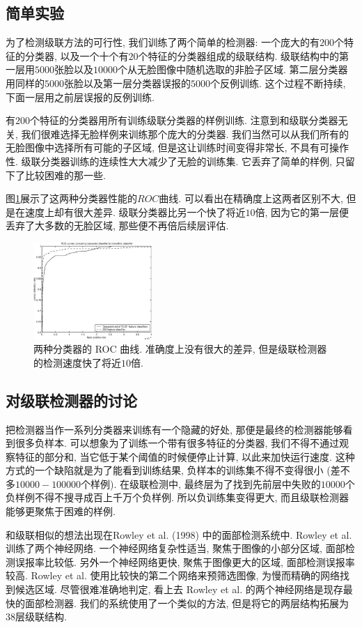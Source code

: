 \documentclass[a4paper,utf8,11pt, onecolumn]{ctexart}
\begin{document}
\subsection{简单实验}
为了检测级联方法的可行性, 我们训练了两个简单的检测器: 一个庞大的有$200$个特征的分类器, 以及一个十个有$20$个特征的分类器组成的级联结构. 级联结构中的第一层用$5000$张脸以及$10000$个从无脸图像中随机选取的非脸子区域.
第二层分类器用同样的$5000$张脸以及第一层分类器误报的$5000$个反例训练. 这个过程不断持续, 下面一层用之前层误报的反例训练.

有$200$个特征的分类器用所有训练级联分类器的样例训练. 注意到和级联分类器无关, 我们很难选择无脸样例来训练那个庞大的分类器. 我们当然可以从我们所有的无脸图像中选择所有可能的子区域, 但是这让训练时间变得非常长, 不具有可操作性. 级联分类器训练的连续性大大减少了无脸的训练集. 它丢弃了简单的样例, 只留下了比较困难的那一些.

图\ref{fig:comp}展示了这两种分类器性能的$ROC$曲线. 可以看出在精确度上这两者区别不大, 但是在速度上却有很大差异. 级联分类器比另一个快了将近$10$倍, 因为它的第一层便丢弃了大多数的无脸区域, 那些便不再倍后续层评估.
\begin{figure}
\centering
\includegraphics[width=0.4\textwidth]{ROC.png}
\caption{两种分类器的 ROC 曲线. 准确度上没有很大的差异, 但是级联检测器的检测速度快了将近$10$倍.}
\label{fig:comp}
\end{figure}
\subsection{对级联检测器的讨论}
把检测器当作一系列分类器来训练有一个隐藏的好处, 那便是最终的检测器能够看到很多负样本. 可以想象为了训练一个带有很多特征的分类器, 我们不得不通过观察特征的部分和, 当它低于某个阈值的时候便停止计算, 以此来加快运行速度. 这种方式的一个缺陷就是为了能看到训练结果, 负样本的训练集不得不变得很小 (差不多$10000-100000$个样例).
在级联检测中, 最终层为了找到先前层中失败的$10000$个负样例不得不搜寻成百上千万个负样例. 所以负训练集变得更大, 而且级联检测器能够更聚焦于困难的样例.

和级联相似的想法出现在Rowley et al. (1998) 中的面部检测系统中. Rowley et al. 训练了两个神经网络. 一个神经网络复杂性适当, 聚焦于图像的小部分区域, 面部检测误报率比较低. 另外一个神经网络更快, 聚焦于图像更大的区域, 面部检测误报率较高. Rowley et al. 使用比较快的第二个网络来预筛选图像, 为慢而精确的网络找到候选区域.
尽管很难准确地判定, 看上去 Rowley et al. 的两个神经网络是现存最快的面部检测器. 我们的系统使用了一个类似的方法, 但是将它的两层结构拓展为$38$层级联结构.
\end{document}
